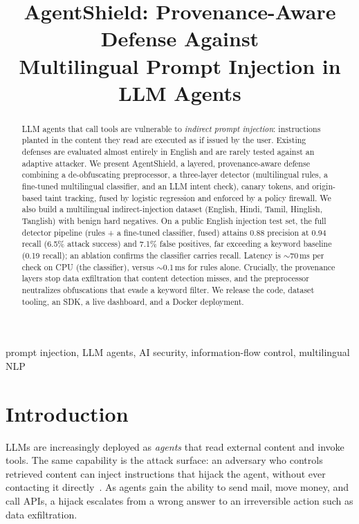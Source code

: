 \documentclass[conference]{IEEEtran}
\begin{document}
\title{AgentShield: Provenance-Aware Defense Against\\Multilingual Prompt Injection in LLM Agents}

\author{\IEEEauthorblockN{[NAME]}
}

\maketitle

\begin{abstract}
LLM agents that call tools are vulnerable to \emph{indirect prompt injection}: instructions planted
in the content they read are executed as if issued by the user. Existing defenses are evaluated
almost entirely in English and are rarely tested against an adaptive attacker. We present
AgentShield, a layered, provenance-aware defense combining a de-obfuscating preprocessor, a
three-layer detector (multilingual rules, a fine-tuned multilingual classifier, and an LLM intent
check), canary tokens, and origin-based taint tracking, fused by logistic regression and enforced
by a policy firewall. We also build a multilingual indirect-injection dataset (English, Hindi,
Tamil, Hinglish, Tanglish) with benign hard negatives. On a public English injection test set, the
full detector pipeline (rules + a fine-tuned classifier, fused) attains 0.88 precision at 0.94
recall (6.5\% attack success) and 7.1\% false positives, far exceeding a keyword baseline (0.19
recall); an ablation confirms the classifier carries recall. Latency is $\sim$70\,ms per check on
CPU (the classifier), versus $\sim$0.1\,ms for rules alone. Crucially, the provenance layers stop
data exfiltration that content detection misses,
and the preprocessor neutralizes obfuscations that evade a keyword filter. We release the code,
dataset tooling, an SDK, a live dashboard, and a Docker deployment.
\end{abstract}

\begin{IEEEkeywords}
prompt injection, LLM agents, AI security, information-flow control, multilingual NLP
\end{IEEEkeywords}

\section{Introduction}
LLMs are increasingly deployed as \emph{agents} that read external content and invoke tools. The
same capability is the attack surface: an adversary who controls retrieved content can inject
instructions that hijack the agent, without ever contacting it directly~\cite{greshake}. As agents
gain the ability to send mail, move money, and call APIs, a hijack escalates from a wrong answer to
an irreversible action such as data exfiltration.
\end{document}
